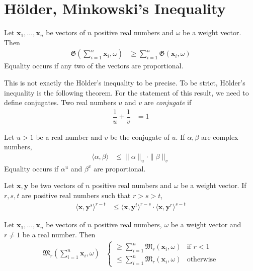 \documentclass[inequalities.tex]{subfile}
\begin{document}
	
	\section{H\"{o}lder, Minkowski's Inequality}\label{sec:holdmink}
	
		\begin{theorem}\label{thm:holder}
			Let $\mathbf{x}_{1},\ldots,\mathbf{x}_{n}$ be vectors of $n$ positive real numbers and $\omega$ be a weight vector. Then
				\begin{align*}
					\mathfrak{G}\left(\sum_{i=1}^{n}\mathbf{x}_{i},\omega\right)
					& \geq \sum_{i=1}^{n}\mathfrak{G}(\mathbf{x}_{i},\omega)
				\end{align*}
			Equality occurs if any two of the vectors are proportional.
		\end{theorem}
	This is not exactly the H\"{o}lder's inequality to be precise. To be strict, H\"{o}lder's inequality is the following theorem. For the statement of this result, we need to define conjugates. Two real numbers $u$ and $v$ are \textit{conjugate} if
		\begin{align*}
			\dfrac{1}{u}+\dfrac{1}{v}
				& = 1
		\end{align*}
	
		\begin{theorem}
			Let $u>1$ be a real number and $v$ be the conjugate of $u$. If $\alpha,\beta$ are complex numbers,
				\begin{align*}
					\langle\alpha,\beta\rangle
						& \leq \|\alpha\|_{u}\cdot\|\beta\|_{v}
				\end{align*}
			Equality occurs if $\alpha^{u}$ and $\beta^{v}$ are proportional.
		\end{theorem}
	
		\begin{theorem}
			Let $\mathbf{x},\mathbf{y}$ be two vectors of $n$ positive real numbers and $\omega$ be a weight vector. If $r,s,t$ are positive real numbers such that $r>s>t$,
				\begin{align*}
					\langle\mathbf{x},\mathbf{y}^{s}\rangle^{r-t}
						& \leq \langle\mathbf{x},\mathbf{y}^{t}\rangle^{r-s}\cdot\langle\mathbf{x},\mathbf{y}^{r}\rangle^{s-t}
				\end{align*}
		\end{theorem}
	
		\begin{theorem}\label{thm:mink}
			Let $\mathbf{x}_{1},\ldots,\mathbf{x}_{n}$ be vectors of $n$ positive real numbers, $\omega$ be a weight vector and $r\neq1$ be a real number. Then
				\begin{align*}
					\mathfrak{M}_{r}\left(\sum_{i=1}^{n}\mathbf{x}_{i},\omega\right)
						&
							\begin{cases}
								\geq \sum_{i=1}^{n}\mathfrak{M}_{r}(\mathbf{x}_{i},\omega)& \mbox{if }r<1\\
								\leq \sum_{i=1}^{n}\mathfrak{M}_{r}(\mathbf{x}_{i}, \omega)& \mbox{otherwise}
							\end{cases}
				\end{align*}
		\end{theorem}
\end{document}
